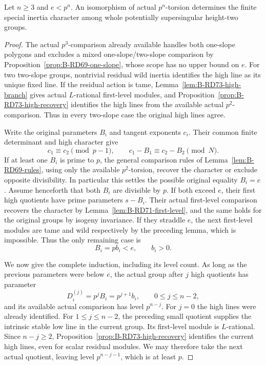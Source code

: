 \begin{proposition}
\label{prop:B-RD74-formal}
Let \(n\ge3\) and \(e<p^n\). An isomorphism of actual
\(p^n\)-torsion determines the finite special inertia character
among whole potentially supersingular height-two groups.
\end{proposition}
\begin{proof}
The actual \(p^3\)-comparison already available handles both
one-slope polygons and excludes a mixed one-slope/two-slope
comparison by Proposition~\ref{prop:B-RD69-one-slope}, whose
scope has no upper bound on \(e\).
For two two-slope groups, nontrivial residual wild inertia
identifies the high line as its unique fixed line. If the
residual action is tame, Lemma~\ref{lem:B-RD73-high-branch}
gives actual \(L\)-rational first-level modules, and
Proposition~\ref{prop:B-RD73-high-recovery} identifies the
high lines from the available actual \(p^2\)-comparison.
Thus in every two-slope case the original high lines agree.

Write the original parameters \(B_i\) and tangent exponents
\(c_i\). Their common finite determinant and high character
give
\[
 c_1\equiv c_2\pmod{p-1},\qquad
 c_1-B_1\equiv c_2-B_2\pmod N.
 \tag{B-RD74.4}
\]
If at least one \(B_i\) is prime to \(p\), the general
comparison rules of Lemma~\ref{lem:B-RD69-rules}, using only
the available \(p^2\)-torsion, recover the character or
exclude opposite divisibility. In particular this settles
the possible original equality \(B_i=e\).
Assume henceforth that both \(B_i\) are divisible by \(p\).
If both exceed \(e\), their first high quotients have prime
parameters \(s-B_i\). Their actual first-level comparison
recovers the character by Lemma~\ref{lem:B-RD71-first-level},
and the same holds for the original groups by isogeny
invariance. If they straddle \(e\), the next first-level
modules are tame and wild respectively by the preceding
lemma, which is impossible. Thus the only remaining case is
\[
 B_i=pb_i<e,\qquad b_i>0.
 \tag{B-RD74.5}
\]

We now give the complete induction, including its level count.
As long as the previous parameters were below \(e\), the
actual group after \(j\) high quotients has parameter
\[
 D_i^{(j)}=p^j B_i=p^{j+1}b_i,
 \qquad 0\le j\le n-2,
 \tag{B-RD74.6}
\]
and its available actual comparison has level \(p^{n-j}\).
For \(j=0\) the high lines were already identified. For
\(1\le j\le n-2\), the preceding small quotient supplies
the intrinsic stable low line in the current group. Its
first-level module is \(L\)-rational. Since \(n-j\ge2\),
Proposition~\ref{prop:B-RD73-high-recovery} identifies the
current high lines, even for scalar residual modules.
We may therefore take the next actual quotient, leaving
level \(p^{n-j-1}\), which is at least \(p\).


\end{proof}
